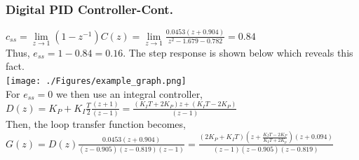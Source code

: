 \documentclass[mathserif, 10pt]{beamer} %
\begin{document}
\frame
{

\small
\frametitle{Digital PID Controller-Cont.}
$c_{ss} = \lim\limits_{z\to1}(1-z^{-1})C(z)= \lim\limits_{z\to1} \frac{0.0453(z+0.904)}{z^2-1.679-0.782}= 0.84$ \\ \vspace{.07in}
Thus, $e_{ss}=1-0.84=0.16$.  The step response is shown below which reveals this fact. \\ \vspace{.1in}
\hspace{1in}
\texttt{[image: ./Figures/example\_graph.png]} \\

For $e_{ss}=0$ we then use an integral controller, \\ \vspace{.07in}
$D(z) = K_P+K_I\frac{T}{2}\frac{(z+1)}{(z-1)} = \frac{(K_IT+2K_P)z+(K_IT-2K_P)}{(z-1)}$\\ \vspace{.07in}
Then, the loop transfer function becomes, \\
$G(z) = D(z)\frac{0.0453(z+0.904)}{(z-0.905)(z-0.819)(z-1)} = \frac{(2K_P+K_IT)(z+\frac{K_IT-2K_P}{K_IT+2K_p})(z+0.094)}{(z-1)(z-0.905)(z-0.819)}$\\



}
\end{document}
